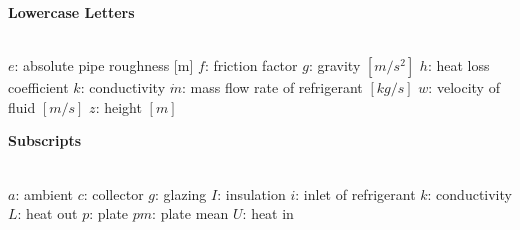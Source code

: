 \documentclass{ucalgarythesis}
\begin{document}
\textbf{Lowercase Letters}
\vspace{-7mm}
\begin{tabbing}
    \textbf{ }\=\\
    \addsymbol \mbox{$e$}: {absolute pipe roughness [m]}
    \addsymbol \mbox{$f$}: {friction factor}
    \addsymbol \mbox{$g$}: {gravity $[m/s^2]$}
    \addsymbol \mbox{$h$}: {heat loss coefficient}
    \addsymbol \mbox{$k$}: {conductivity}
    \addsymbol \mbox{$\dot m$}: {mass flow rate of refrigerant $[kg/s]$}
    \addsymbol \mbox{$w$}: {velocity of fluid $[m/s]$}
    \addsymbol \mbox{$z$}: {height $[m]$}
\end{tabbing}
\vspace{-3mm}

\textbf{Subscripts}
\vspace{-7mm}
\begin{tabbing}
    \textbf{ }\=\\
    \addsymbol \mbox{$a$}: {ambient}
    \addsymbol \mbox{$c$}: {collector }
    \addsymbol \mbox{$g$}: {glazing}
    \addsymbol \mbox{$I$}: {insulation}
    \addsymbol \mbox{$i$}: {inlet of refrigerant}
    \addsymbol \mbox{$k$}: {conductivity}
    \addsymbol \mbox{$L$}: {heat out}
    \addsymbol \mbox{$p$}: {plate}
    \addsymbol \mbox{$pm$}: {plate mean}
    \addsymbol \mbox{$U$}: {heat in}    
\end{tabbing}
\newpage


\mainmatter







%


\thesisbibliography
\end{document}
